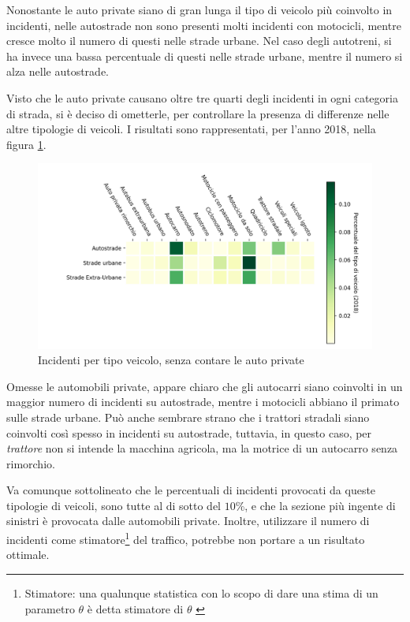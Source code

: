 \documentclass[a4paper,12pt]{report}
\newcommand{\quotestyle}[1]{\textit{#1}}
\begin{document}
Nonostante le auto private siano di gran lunga il tipo di veicolo 
più coinvolto in incidenti, nelle autostrade non sono presenti molti incidenti con motocicli, 
mentre cresce molto il numero di questi nelle strade urbane.
Nel caso degli autotreni, si ha invece una bassa percentuale di questi nelle strade 
urbane, mentre il numero si alza nelle autostrade.

Visto che le auto private causano oltre tre quarti degli incidenti in ogni categoria di strada,  
si è deciso di ometterle, per controllare la presenza di differenze nelle altre tipologie 
di veicoli.
I risultati sono rappresentati, per l'anno 2018, nella figura \ref{fig:differenza-strade-no-auto}.

\begin{figure}
    \includegraphics[width=\linewidth]{../src/incidenti/incidenti_senza_coords/tipo_veicoli/differenza_senza_auto.png}
    \caption{Incidenti per tipo veicolo, senza contare le auto private}
    \label{fig:differenza-strade-no-auto}
\end{figure}

Omesse le automobili private, appare chiaro che gli autocarri siano coinvolti in un maggior 
numero di incidenti su autostrade, mentre i motocicli abbiano il primato sulle strade urbane.
Può anche sembrare strano che i trattori stradali siano coinvolti così spesso in incidenti 
su autostrade, tuttavia, in questo caso, per \quotestyle{trattore} non si intende la macchina 
agricola, ma la motrice di un autocarro senza rimorchio.

Va comunque sottolineato che le percentuali di incidenti provocati da queste tipologie di 
veicoli, sono tutte al di sotto del $10$\%, e che la sezione più ingente di sinistri è 
provocata dalle automobili private. 
Inoltre, utilizzare il numero di incidenti come stimatore\footnote{Stimatore: una qualunque statistica con 
lo scopo di dare una stima di un parametro $\theta$ è detta stimatore 
di $\theta$ \cite{PROB_E_STATISTICA:4}} 
del traffico, potrebbe non portare a un risultato ottimale. 
\end{document}
